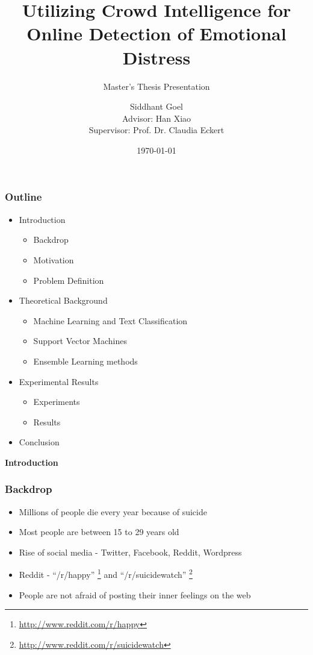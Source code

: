\documentclass{beamer}
\title{Utilizing Crowd Intelligence for Online Detection of Emotional Distress}
\subtitle{Master's Thesis Presentation}
\author[Siddhant Goel]{Siddhant Goel\\{\small Advisor: Han Xiao\\Supervisor: Prof. Dr. Claudia Eckert}}
\institute{
Chair for IT Security\\
Technische Universit\"at M\"unchen
}
\date{\today}
\begin{document}
    \begin{frame}[plain]
        \titlepage
    \end{frame}
    
    \begin{frame}
        \frametitle{Outline}
        \begin{itemize}
            \item{
            Introduction
            \begin{itemize}
                \item{Backdrop}
                \item{Motivation}
                \item{Problem Definition}
            \end{itemize}
            }
            \item{
            Theoretical Background
            \begin{itemize}
                \item{Machine Learning and Text Classification}
                \item{Support Vector Machines}
                \item{Ensemble Learning methods}
            \end{itemize}
            }
            \item{
            Experimental Results
            \begin{itemize}
                \item{Experiments}
                \item{Results}
            \end{itemize}
            }
            \item{Conclusion}
        \end{itemize}
    \end{frame}
    
    \begin{frame}
        \begin{center}
            \textbf{Introduction}
        \end{center}
    \end{frame}
    
    \begin{frame}
        \frametitle{Backdrop}
        \begin{itemize}
            \item{Millions of people die every year because of suicide}
            \item{Most people are between 15 to 29 years old}
            \item{Rise of social media - Twitter, Facebook, Reddit, Wordpress}
            \item{Reddit - ``/r/happy'' \footnote{\url{http://www.reddit.com/r/happy}} and ``/r/suicidewatch'' \footnote{\url{http://www.reddit.com/r/suicidewatch}}}
            \item{People are not afraid of posting their inner feelings on the web}
        \end{itemize}
    \end{frame}
    
\end{document}
